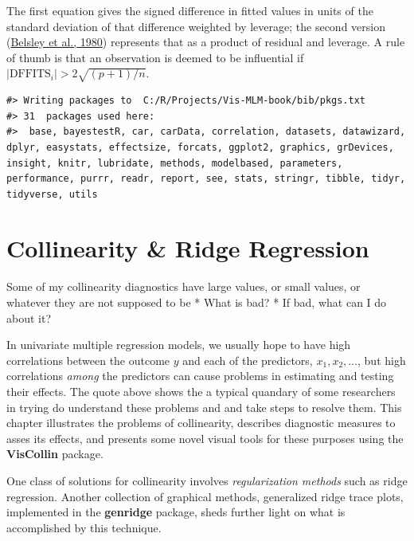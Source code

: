 \documentclass[
  letterpaper,
  10pt,
  krantz2]{krantz}
\renewenvironment{quote}{\begin{VF}}{\end{VF}}
\begin{document}
The first equation gives the signed difference in fitted values in units
of the standard deviation of that difference weighted by leverage; the
second version (\protect\hyperlink{ref-Belsley-etal:80}{Belsley et al.,
1980}) represents that as a product of residual and leverage. A rule of
thumb is that an observation is deemed to be influential if
\(| \text{DFFITS}_i | > 2 \sqrt{(p+1) / n}\).

\begin{verbatim}
#> Writing packages to  C:/R/Projects/Vis-MLM-book/bib/pkgs.txt
#> 31  packages used here:
#>  base, bayestestR, car, carData, correlation, datasets, datawizard, dplyr, easystats, effectsize, forcats, ggplot2, graphics, grDevices, insight, knitr, lubridate, methods, modelbased, parameters, performance, purrr, readr, report, see, stats, stringr, tibble, tidyr, tidyverse, utils
\end{verbatim}


\hypertarget{sec-collin}{%
\chapter{Collinearity \& Ridge Regression}\label{sec-collin}}

\begin{quote}
Some of my collinearity diagnostics have large values, or small values,
or whatever they are not supposed to be * What is bad? * If bad, what
can I do about it?
\end{quote}

In univariate multiple regression models, we usually hope to have high
correlations between the outcome \(y\) and each of the predictors,
\(x_1, x_2, \dots\), but high correlations \emph{among} the predictors
can cause problems in estimating and testing their effects. The quote
above shows the a typical quandary of some researchers in trying do
understand these problems and and take steps to resolve them. This
chapter illustrates the problems of collinearity, describes diagnostic
measures to asses its effects, and presents some novel visual tools for
these purposes using the \textbf{VisCollin} package.

One class of solutions for collinearity involves \emph{regularization
methods} such as ridge regression. Another collection of graphical
methods, generalized ridge trace plots, implemented in the
\textbf{genridge} package, sheds further light on what is accomplished
by this technique.
\end{document}
